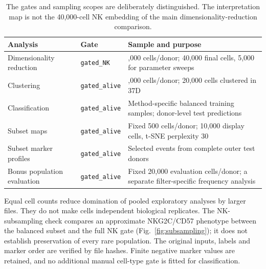 \documentclass[11pt,a4paper]{article}
\begin{document}
\begin{table}[htb]\centering\small
\begin{tabular}{@{}>{\raggedright\arraybackslash}p{.25\linewidth}>{\raggedright\arraybackslash}p{.18\linewidth}>{\raggedright\arraybackslash}p{.49\linewidth}@{}}\toprule
Analysis & Gate & Sample and purpose\\\midrule
Dimensionality reduction & \texttt{gated\_NK} & 2,000 cells/donor; 40,000 final cells, 5,000 for parameter sweeps\\
Clustering & \texttt{gated\_alive} & 1,000 cells/donor; 20,000 cells clustered in 37D\\
Classification & \texttt{gated\_alive} & Method-specific balanced training samples; donor-level test predictions\\
Subset maps & \texttt{gated\_alive} & Fixed 500 cells/donor; 10,000 display cells, t-SNE perplexity 30\\
Subset marker profiles & \texttt{gated\_alive} & Selected events from complete outer test donors\\
Bonus population evaluation & \texttt{gated\_alive} & Fixed 20,000 evaluation cells/donor; a separate filter-specific frequency analysis\\\bottomrule
\end{tabular}
\caption{The gates and sampling scopes are deliberately distinguished. The interpretation map is not the 40,000-cell NK embedding of the main dimensionality-reduction comparison.}
\end{table}

Equal cell counts reduce domination of pooled exploratory analyses by larger files. They do not make cells independent biological replicates. The NK-subsampling check compares an approximate NKG2C/CD57 phenotype between the balanced subset and the full NK gate (Fig.~\ref{fig:subsampling}); it does not establish preservation of every rare population. The original inputs, labels and marker order are verified by file hashes. Finite negative marker values are retained, and no additional manual cell-type gate is fitted for classification.

\clearpage
\begin{table}[htb]\centering\small

\caption{Donor inventory from the current raw-data summaries. Test visits are the appearances in the 30 common outer splits; the same counts apply to every method. NK/alive is a percentage, not an additional classifier feature.}
\label{tab:donors}
\end{table}
\end{document}

